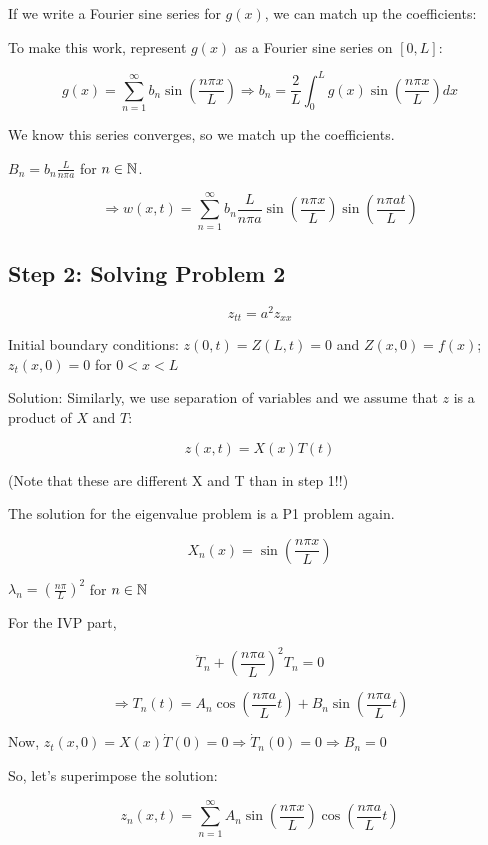 \documentclass{article}
\begin{document}
If we write a Fourier sine series for $g(x)$, we can match up the coefficients:

To make this work, represent $g(x)$ as a Fourier sine series on $\left[ 0, L \right]$:

$$g(x) = \sum_{n = 1}^\infty b_n \sin \left(\frac{ n \pi x}{L} \right) \Rightarrow b_n = \frac{2}{L} \int_0^L g(x) \sin \left( \frac{ n \pi x}{L} \right) dx$$

We know this series converges, so we match up the coefficients. 
\begin{center}
    $B_n = b_n \frac{L}{n \pi a}$ for $n \in \mathbb{N}$. 
\end{center}


$$\Rightarrow w(x,t) = \sum_{n = 1}^\infty b_n \frac{L}{n \pi a} \sin \left( \frac{n \pi x}{L} \right) \sin \left( \frac{n \pi a t}{L} \right) $$

\subsection{Step 2: Solving Problem 2}

$$z_{tt} = a^2 z_{xx}$$

Initial boundary conditions: $z(0,t) = Z(L,t) = 0$ and $Z(x,0) = f(x)$; $z_t (x,0) = 0$ for $0 < x < L$

Solution: Similarly, we use separation of variables and we assume that $z$ is a product of $X$ and $T$:

$$z(x,t) = X(x) T(t)$$

(Note that these are different X and T than in step 1!!)

The solution for the eigenvalue problem is a P1 problem again. 

$$X_n(x) = \sin \left( \frac{n \pi x}{L} \right)$$
\begin{center}
    $\lambda_n = \left( \frac{n \pi}{L} \right)^2$ for $n \in \mathbb{N}$
\end{center}


For the IVP part, 

$$\ddot{T}_n + \left( \frac{n \pi a}{L} \right)^2 T_n = 0$$

$$\Rightarrow T_n(t) = A_n \cos \left( \frac{n \pi a}{L} t \right) + B_n \sin \left( \frac{n \pi a}{L} t \right)$$

Now, $z_t(x,0) = X(x) \dot{T}(0) = 0 \Rightarrow \dot{T}_n(0) = 0 \Rightarrow B_n = 0$

So, let's superimpose the solution:

$$z_n (x,t) = \sum_{n = 1}^\infty A_n \sin \left( \frac{n \pi x}{L} \right) \cos \left( \frac{n \pi a}{L} t \right)$$
\end{document}
